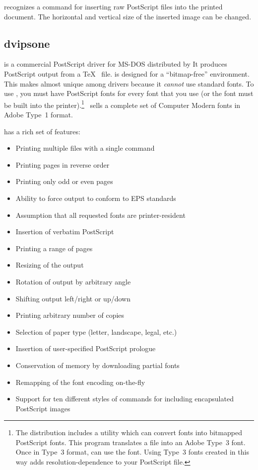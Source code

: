  recognizes a  command for inserting
raw PostScript files into the printed document.  The horizontal and
vertical size of the inserted image can be changed.

\subsection{dvipsone}

 is a commercial PostScript driver for MS-DOS
distributed by  It
produces PostScript output from a \TeX\  file.
 is designed for a ``bitmap-free'' environment.
This makes  almost unique among  drivers
because it {\em cannot\/} use standard  fonts.  To
use , you must have PostScript fonts for
every font that you use (or the font must be built into the
printer).\footnote{The  distribution includes a utility
which can convert  fonts into bitmapped PostScript fonts.
This program translates a  file into an Adobe
Type~3 font.  Once in Type~3 format,  can
use the font.  Using Type~3 fonts created in this way 
adds resolution-dependence to your PostScript file.}
\YY\ sells a complete set of Computer Modern fonts
in Adobe Type~1 format.  

 has a rich set of features:

\begin{itemize}
  \item Printing multiple  files with a single command
  \item Printing pages in reverse order
  \item Printing only odd or even pages
  \item Ability to force output to conform to EPS standards
  \item Assumption that all requested fonts are printer-resident
  \item Insertion of verbatim PostScript
  \item Printing a range of pages
  \item Resizing of the output
  \item Rotation of output by arbitrary angle
  \item Shifting output left/right or up/down
  \item Printing arbitrary number of copies
  \item Selection of paper type (letter, landscape, legal, etc.)
  \item Insertion of user-specified PostScript prologue
  \item Conservation of memory by downloading partial fonts
  \item Remapping of the font encoding on-the-fly
  \item Support for ten different styles of  commands for
        including encapsulated PostScript images
\end{itemize}

